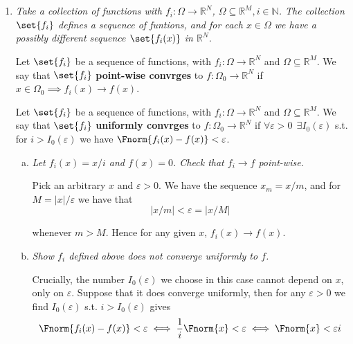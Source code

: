 \documentclass{article}
\begin{document}
\displayoptions

\section{}

\begin{enumerate}[1.]
  \item {\itshape
    Take a collection of functions with $f_i: \Omega \to \mathbb{R}^N$, $\Omega \subseteq \mathbb{R}^M, i \in \mathbb{N}$. The collection $\set{f_i}$ defines a sequence of funtions, and for each $x \in \Omega$ we have a possibly different sequence $\set{f_i(x)}$ in $\mathbb{R}^N$.

    Let $\set{f_i}$ be a sequence of functions, with $f_i: \Omega \to \mathbb{R}^N$ and $\Omega \subseteq \mathbb{R}^M$. We say that $\set{f_i}$ \textbf{point-wise convrges} to $f: \Omega_0 \to \mathbb{R}^N$ if $x \in \Omega_0 \implies f_i(x) \to f(x)$.

    Let $\set{f_i}$ be a sequence of functions, with $f_i: \Omega \to \mathbb{R}^N$ and $\Omega \subseteq \mathbb{R}^M$. We say that $\set{f_i}$ \textbf{uniformly convrges} to $f: \Omega_0 \to \mathbb{R}^N$ if $\forall \varepsilon > 0 ~~ \exists I_0(\varepsilon)$ s.t. for $i > I_0(\varepsilon)$ we have $\Fnorm{f_i(x) - f(x)} < \varepsilon$. }

    \begin{enumerate}[a)]
      \item \textit{Let $f_i(x) = x / i$ and $f(x) = 0$. Check that $f_i \to f$ point-wise.}

        \solution Pick an arbitrary $x$ and $\varepsilon > 0$. We have the sequence $x_m = x / m$, and for $M = |x| / \varepsilon$ we have that
        \[
          |x / m| < \varepsilon = |x / M|
        \]

        whenever $m > M$. Hence for any given $x$, $f_i(x) \to f(x)$.

      \item \textit{Show $f_i$ defined above does not converge uniformly to $f$.}

        \solution Crucially, the number $I_0(\varepsilon)$ we choose in this case cannot depend on $x$, only on $\varepsilon$. Suppose that it does converge uniformly, then for any $\varepsilon > 0$ we find $I_0(\varepsilon)$ s.t. $i > I_0(\varepsilon)$ gives
        \[
          \Fnorm{f_i(x) - f(x)} < \varepsilon
          \iff
          \dfrac{1}{i} \Fnorm{x} < \varepsilon
          \iff
          \Fnorm{x} < \varepsilon i
        \]


\end{enumerate}
\end{enumerate}
\end{document}
